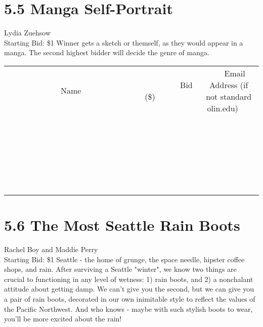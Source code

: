 \documentclass[11pt]{article}
\begin{document}
\section*{5.5 Manga Self-Portrait}
Lydia Zuehsow
\\
Starting Bid: \$1
\newline
Winner gets a sketch or themself, as they would appear in a manga. The second highest bidder will decide the genre of manga.
\\[6ex]
\begin{tabular}{c c c}
~~~~~~~~~~~~~Name~~~~~~~~~~~~~ & ~~~~~~~~~Bid (\$)~~~~~~~~~  & ~~~Email Address (if not standard olin.edu)~~~\\
 & & \\
\hline
 & & \\
\hline
 & & \\
\hline
 & & \\
\hline
 & & \\
\hline
 & & \\
\hline
 & & \\
\hline
 & & \\
\hline
 & & \\
\hline
 & & \\
\hline
 & & \\
\hline
 & & \\
\hline
 & & \\
\hline
 & & \\
\hline
 & & \\
\hline
 & & \\
\hline
 & & \\
\hline
 & & \\
\hline
 & & \\
\hline
 & & \\
\hline
 & & \\
\hline
 & & \\
\hline
 & & \\
\hline
 & & \\
\hline
 & & \\
\hline
 & & \\
\hline
\end{tabular}
\newpage
\section*{5.6 The Most Seattle Rain Boots}
Rachel Boy and Maddie Perry
\\
Starting Bid: \$1
\newline
Seattle - the home of grunge, the space needle, hipster coffee shops, and rain. After surviving a Seattle "winter", we know two things are crucial to functioning in any level of wetness: 1) rain boots, and 2) a nonchalant attitude about getting damp. We can't give you the second, but we can give you a pair of rain boots, decorated in our own inimitable style to reflect the values of the Pacific Northwest. And who knows - maybe with such stylish boots to wear, you'll be more excited about the rain!
\end{document}
